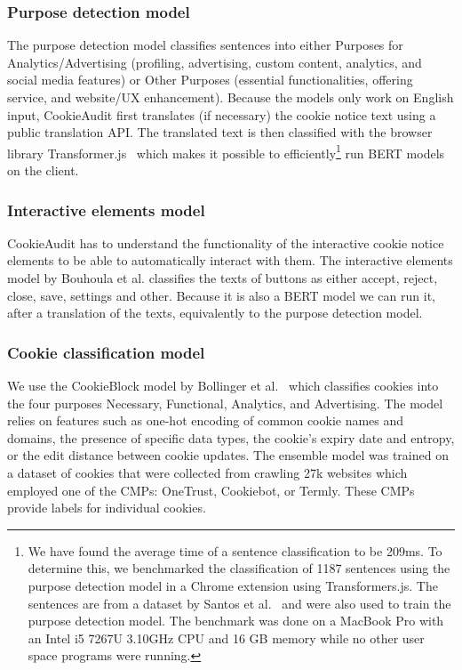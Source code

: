 \subsubsection{Purpose detection model}
The purpose detection model classifies sentences into either Purposes for Analytics/Advertising (profiling, advertising, custom content, analytics, and social media features) or Other Purposes (essential functionalities, offering service, and website/UX enhancement).
Because the models only work on English input, CookieAudit first translates (if necessary) the cookie notice text using a public translation API.
The translated text is then classified with the browser library Transformer.js~\cite{huggingface2023transformers} which makes it possible to efficiently\footnote{
We have found the average time of a sentence classification to be 209ms. 
To determine this, we benchmarked the classification of 1187 sentences using the purpose detection model in a Chrome extension using Transformers.js.
The sentences are from a dataset by Santos et al.~\cite{santos2021cookie} and were also used to train the purpose detection model.
The benchmark was done on a MacBook Pro with an Intel i5 7267U 3.10GHz CPU and 16 GB memory while no other user space programs were running.
} run BERT models on the client.

\subsubsection{Interactive elements model}
CookieAudit has to understand the functionality of the interactive cookie notice elements to be able to automatically interact with them.
The interactive elements model by Bouhoula et al. classifies the texts of buttons as either accept, reject, close, save, settings and other.
Because it is also a BERT model we can run it, after a translation of the texts, equivalently to the purpose detection model.

\subsubsection{Cookie classification model}
We use the CookieBlock model by Bollinger et al.~\cite{bollinger2022automating} which classifies cookies into the four purposes \textsf{Necessary}, \textsf{Functional}, \textsf{Analytics}, and \textsf{Advertising}.
The model relies on features such as one-hot encoding of common cookie names and domains, the presence of specific data types, the cookie's expiry date and entropy, or the edit distance between cookie updates.
The ensemble model was trained on a dataset of cookies that were collected from crawling 27k websites which employed one of the CMPs: OneTrust, Cookiebot, or Termly.
These CMPs provide labels for individual cookies.

